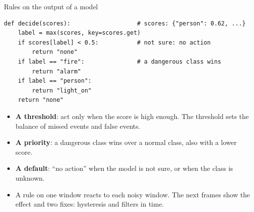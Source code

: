 \begin{frame}[fragile]{Rules on the output of a model}
\begin{lstlisting}[style=python]
def decide(scores):                   # scores: {"person": 0.62, ...}
    label = max(scores, key=scores.get)
    if scores[label] < 0.5:           # not sure: no action
        return "none"
    if label == "fire":               # a dangerous class wins
        return "alarm"
    if label == "person":
        return "light_on"
    return "none"
\end{lstlisting}
  \small
  \begin{itemize}
    \item \textbf{A threshold}: act only when the score is high enough.
          The threshold sets the balance of missed events and false
          events.
    \item \textbf{A priority}: a dangerous class wins over a normal class,
          also with a lower score.
    \item \textbf{A default}: ``no action'' when the model is not sure, or
          when the class is unknown.
    \item A rule on one window reacts to each noisy window. The next frames
          show the effect and two fixes: hysteresis and filters in time.
  \end{itemize}
\end{frame}

